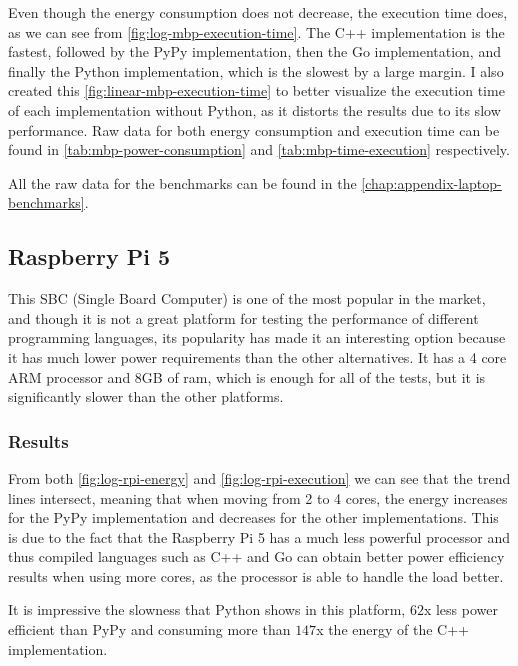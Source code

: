 Even though the energy consumption does not decrease, the execution time does, as we can see from \autoref{fig:log-mbp-execution-time}. The C++ implementation is the fastest, followed by the PyPy implementation, then the Go implementation, and finally the Python implementation, which is the slowest by a large margin. I also created this \autoref{fig:linear-mbp-execution-time} to better visualize the execution time of each implementation without Python, as it distorts the results due to its slow performance. Raw data for both energy consumption and execution time can be found in \autoref{tab:mbp-power-consumption} and \autoref{tab:mbp-time-execution} respectively.

All the raw data for the benchmarks can be found in the \autoref{chap:appendix-laptop-benchmarks}.

\FloatBarrier
\subsection{Raspberry Pi 5}
This SBC (Single Board Computer) is one of the most popular in the market, and though it is not a great platform for testing the performance of different programming languages, its popularity has made it an interesting option because it has much lower power requirements than the other alternatives. It has a 4 core \gls{ARM} processor and 8GB of \gls{ram}, which is enough for all of the tests, but it is significantly slower than the other platforms.

\subsubsection{Results}





From both \autoref{fig:log-rpi-energy} and \autoref{fig:log-rpi-execution} we can see that the trend lines intersect, meaning that when moving from 2 to 4 cores, the energy increases for the PyPy implementation and decreases for the other implementations. This is due to the fact that the Raspberry Pi 5 has a much less powerful processor and thus compiled languages such as C++ and Go can obtain better power efficiency results when using more cores, as the processor is able to handle the load better.

It is impressive the slowness that Python shows in this platform, $62$x less power efficient than PyPy and consuming more than $147$x the energy of the C++ implementation. 

